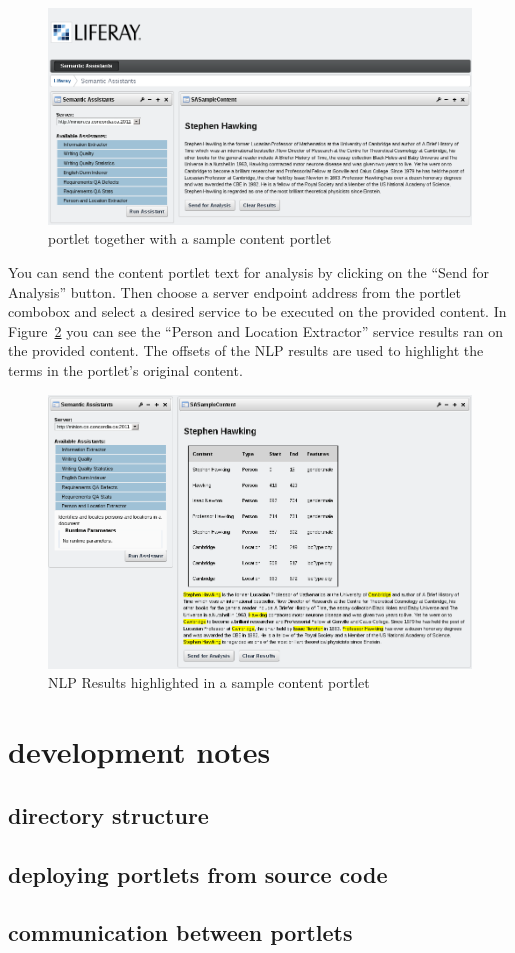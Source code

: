 \begin{figure}
\centering
\includegraphics[scale=0.6]{pictures/liferay_both_portlets.png}
\caption{\sa portlet together with a sample content portlet}
\label{fig:liferay_both_portlets}
\end{figure}

You can send the content portlet text for analysis by clicking on the ``Send for Analysis'' button. Then choose a server endpoint address from the \sa portlet combobox and select a desired service to be executed on the provided content. In Figure~\ref{fig:liferay_results_portlet} you can see the ``Person and Location Extractor'' service results ran on the provided content. The offsets of the NLP results are used to highlight the terms in the portlet's original content.

\begin{figure}
\centering
\includegraphics[scale=0.6]{pictures/liferay_results_portlet.png}
\caption{NLP Results highlighted in a sample content portlet}
\label{fig:liferay_results_portlet}
\end{figure}

\section{development notes}
\subsection{directory structure}
\subsection{deploying portlets from source code}
\subsection{communication between portlets}